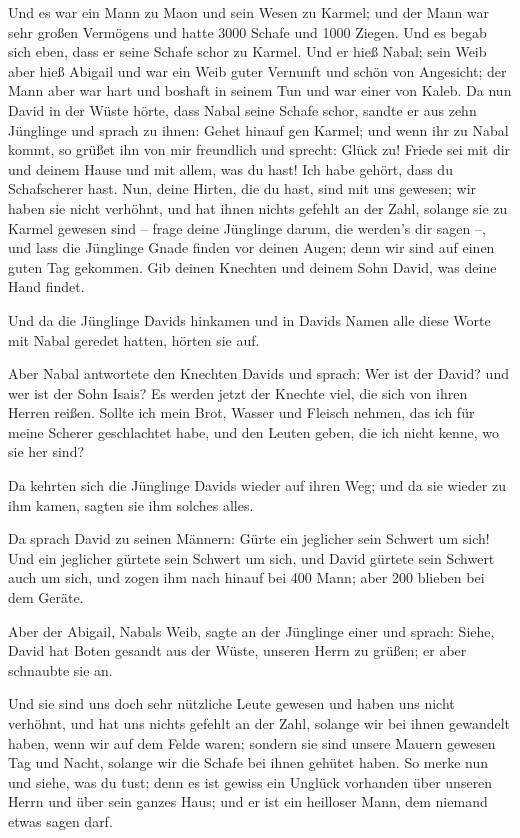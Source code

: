  Und es war ein Mann zu Maon und sein Wesen zu Karmel; und
der Mann war sehr großen Vermögens und hatte 3000 Schafe und 1000
Ziegen. Und es begab sich eben, dass er seine Schafe schor zu Karmel.
 Und er hieß Nabal; sein Weib aber hieß Abigail und war ein
Weib guter Vernunft und schön von Angesicht; der Mann aber war hart und
boshaft in seinem Tun und war einer von Kaleb.  Da nun David
in der Wüste hörte, dass Nabal seine Schafe schor,  sandte
er aus zehn Jünglinge und sprach zu ihnen: Gehet hinauf gen Karmel; und
wenn ihr zu Nabal kommt, so grüßet ihn von mir freundlich 
und sprecht: Glück zu! Friede sei mit dir und deinem Hause und mit
allem, was du hast!  Ich habe gehört, dass du Schafscherer
hast. Nun, deine Hirten, die du hast, sind mit uns gewesen; wir haben
sie nicht verhöhnt, und hat ihnen nichts gefehlt an der Zahl, solange
sie zu Karmel gewesen sind --  frage deine Jünglinge darum,
die werden's dir sagen --, und lass die Jünglinge Gnade finden vor
deinen Augen; denn wir sind auf einen guten Tag gekommen. Gib deinen
Knechten und deinem Sohn David, was deine Hand findet.

 Und da die Jünglinge Davids hinkamen und in Davids Namen
alle diese Worte mit Nabal geredet hatten, hörten sie auf.

 Aber Nabal antwortete den Knechten Davids und sprach: Wer
ist der David? und wer ist der Sohn Isais? Es werden jetzt der Knechte
viel, die sich von ihren Herren reißen.  Sollte ich mein
Brot, Wasser und Fleisch nehmen, das ich für meine Scherer geschlachtet
habe, und den Leuten geben, die ich nicht kenne, wo sie her sind?

 Da kehrten sich die Jünglinge Davids wieder auf ihren Weg;
und da sie wieder zu ihm kamen, sagten sie ihm solches alles.

 Da sprach David zu seinen Männern: Gürte ein jeglicher
sein Schwert um sich! Und ein jeglicher gürtete sein Schwert um sich,
und David gürtete sein Schwert auch um sich, und zogen ihm nach hinauf
bei 400 Mann; aber 200 blieben bei dem Geräte.

 Aber der Abigail, Nabals Weib, sagte an der Jünglinge
einer und sprach: Siehe, David hat Boten gesandt aus der Wüste, unseren
Herrn zu grüßen; er aber schnaubte sie an.

 Und sie sind uns doch sehr nützliche Leute gewesen und
haben uns nicht verhöhnt, und hat uns nichts gefehlt an der Zahl,
solange wir bei ihnen gewandelt haben, wenn wir auf dem Felde waren;
 sondern sie sind unsere Mauern gewesen Tag und Nacht,
solange wir die Schafe bei ihnen gehütet haben.  So merke
nun und siehe, was du tust; denn es ist gewiss ein Unglück vorhanden
über unseren Herrn und über sein ganzes Haus; und er ist ein heilloser
Mann, dem niemand etwas sagen darf.

